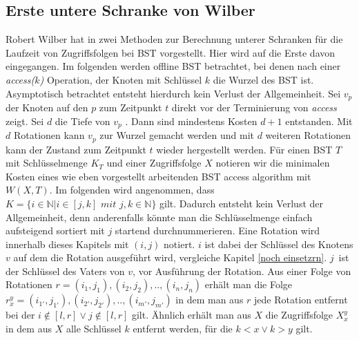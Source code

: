 \documentclass[a4paper,12pt]{article}
\begin{document}
\subsection{Erste untere Schranke von Wilber}
Robert Wilber hat in \cite{wilberLowerBounds} zwei Methoden zur Berechnung unterer Schranken für die Laufzeit von Zugriffsfolgen bei BST vorgestellt. Hier wird auf die Erste davon eingegangen. Im folgenden werden offline BST betrachtet, bei denen nach einer \textit{access($k$)} Operation, der Knoten mit Schlüssel $k$ die Wurzel des BST ist. Asymptotisch betrachtet entsteht hierdurch kein Verlust der Allgemeinheit. Sei $v_p$ der Knoten auf den $p$ zum Zeitpunkt $t$ direkt vor der Terminierung von \textit{access} zeigt. Sei $d$ die Tiefe von $v_p$ . Dann sind mindestens Kosten $d + 1$ entstanden. Mit $d$ Rotationen kann $v_p$ zur Wurzel gemacht werden und mit $d$ weiteren Rotationen kann der Zustand zum Zeitpunkt $t$ wieder hergestellt werden.
Für einen BST $T$ mit Schlüsselmenge $K_T$ und einer Zugriffsfolge $X$ notieren wir die minimalen Kosten eines wie eben vorgestellt arbeitenden BST access algorithm mit $W(X, T)$. Im folgenden wird angenommen, dass \\
$K = \{  i \in \mathbb{N} \vert i \in \left[j,k\right] \textit{ mit } j,k \in  \mathbb{N} \} $ gilt. Dadurch entsteht kein Verlust der Allgemeinheit, denn anderenfalls könnte man die Schlüsselmenge einfach aufsteigend sortiert mit $j$ startend durchnummerieren. Eine Rotation wird innerhalb dieses Kapitels mit $\left(i, j\right)$ notiert. $i$ ist dabei der Schlüssel des Knotens $v$ auf dem die Rotation ausgeführt wird, vergleiche Kapitel \ref{noch einsetzrn}. $j$~ist der Schlüssel des Vaters von $v$, vor Ausführung der Rotation. Aus einer Folge von Rotationen $r = \left(i_1,j_1 \right),\left(i_2,j_2 \right),..,\left(i_n,j_n \right)$ erhält man die Folge  $r^y_x = \left(i_{1'},j_{1'}\right),\left(i_{2'},j_{2'} \right),..,\left(i_{m'},j_{m'} \right)$  in dem man aus $r$ jede Rotation entfernt bei der $i\notin \left[l,r\right] \lor j\notin \left[l,r\right]$ gilt. Ähnlich erhält man aus $X$ die Zugriffsfolge $X^y_x$ in dem aus $X$ alle Schlüssel $k$ entfernt werden, für die $k < x  \lor k > y$ gilt.
\end{document}

